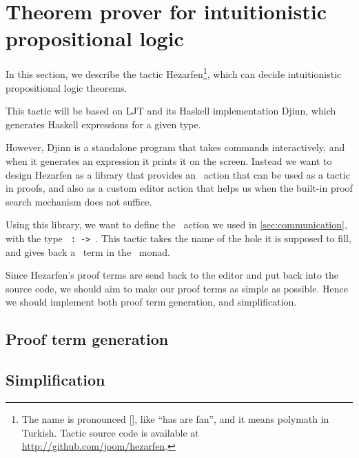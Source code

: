 

\section{Theorem prover for intuitionistic propositional logic}\label{sec:hezarfen}

In this section, we describe the tactic Hezarfen\footnote{ The name is
  pronounced {[]}, like ``has are fan'', and it means
    polymath in Turkish.  Tactic source code is available at
    \url{http://github.com/joom/hezarfen}.}, which can decide intuitionistic
propositional logic theorems.

This tactic will be based on LJT\cite{ljt} and its Haskell
implementation Djinn\cite{djinn}, which generates Haskell expressions
for a given type.

However, Djinn is a standalone program that takes commands
interactively, and when it generates an expression it prints it on the screen.
Instead we want to design Hezarfen as a library that provides an \Elab\ action
that can be used as a tactic in proofs, and also as a custom editor action that
helps us when the built-in proof search mechanism does not suffice.

Using this library, we want to define the \Elab\ action we used in
\autoref{sec:communication}, with the type
\texttt{ :  ->  }.
This tactic takes the name of the hole it is supposed to fill, and gives back a
\TT\ term in the \Elab\ monad.

Since Hezarfen's proof terms are send back to the editor and put back into the
source code, we should aim to make our proof terms as simple as possible.
Hence we should implement both proof term generation, and simplification.

\subsection{Proof term generation}



\subsection{Simplification}

